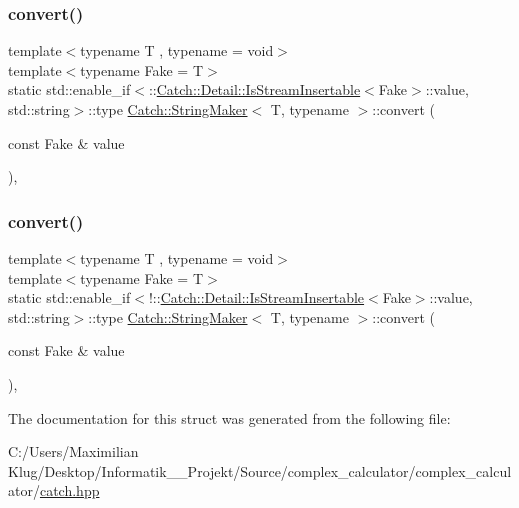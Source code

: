 \subsubsection{\texorpdfstring{convert()}{convert()}\hspace{0.1cm}{\footnotesize\ttfamily [1/2]}}
{\footnotesize\ttfamily template$<$typename T , typename  = void$>$ \\
template$<$typename Fake  = T$>$ \\
static std\+::enable\+\_\+if$<$\+::\mbox{\hyperlink{class_catch_1_1_detail_1_1_is_stream_insertable}{Catch\+::\+Detail\+::\+Is\+Stream\+Insertable}}$<$Fake$>$\+::value, std\+::string$>$\+::type \mbox{\hyperlink{struct_catch_1_1_string_maker}{Catch\+::\+String\+Maker}}$<$ T, typename $>$\+::convert (\begin{DoxyParamCaption}\item[{const Fake \&}]{value }\end{DoxyParamCaption})\hspace{0.3cm}{\ttfamily [inline]}, {\ttfamily [static]}}

\mbox{\label{struct_catch_1_1_string_maker_a68bb548de0e5ad364228b1ca3dd2f561}} 
\subsubsection{\texorpdfstring{convert()}{convert()}\hspace{0.1cm}{\footnotesize\ttfamily [2/2]}}
{\footnotesize\ttfamily template$<$typename T , typename  = void$>$ \\
template$<$typename Fake  = T$>$ \\
static std\+::enable\+\_\+if$<$!\+::\mbox{\hyperlink{class_catch_1_1_detail_1_1_is_stream_insertable}{Catch\+::\+Detail\+::\+Is\+Stream\+Insertable}}$<$Fake$>$\+::value, std\+::string$>$\+::type \mbox{\hyperlink{struct_catch_1_1_string_maker}{Catch\+::\+String\+Maker}}$<$ T, typename $>$\+::convert (\begin{DoxyParamCaption}\item[{const Fake \&}]{value }\end{DoxyParamCaption})\hspace{0.3cm}{\ttfamily [inline]}, {\ttfamily [static]}}



The documentation for this struct was generated from the following file\+:\begin{DoxyCompactItemize}
\item 
C\+:/\+Users/\+Maximilian Klug/\+Desktop/\+Informatik\+\_\+\_\+\+Projekt/\+Source/complex\+\_\+calculator/complex\+\_\+calculator/\mbox{\hyperlink{catch_8hpp}{catch.\+hpp}}\end{DoxyCompactItemize}
